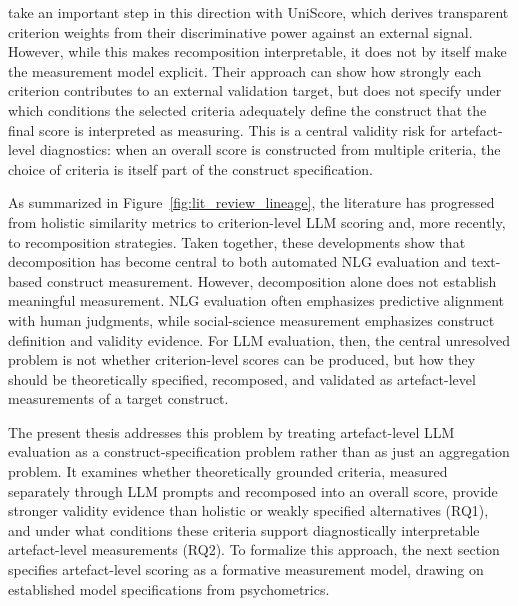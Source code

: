 \citet{bang_transforming_2025} take an important step in this direction with UniScore, which derives transparent criterion weights from their discriminative power against an external signal. However, while this makes recomposition interpretable, it does not by itself make the measurement model explicit. Their approach can show how strongly each criterion contributes to an external validation target, but does not specify under which conditions the selected criteria adequately define the construct that the final score is interpreted as measuring. This is a central validity risk for artefact-level diagnostics: when an overall score is constructed from multiple criteria, the choice of criteria is itself part of the construct specification.

As summarized in Figure~\ref{fig:lit_review_lineage}, the literature has progressed from holistic similarity metrics to criterion-level LLM scoring and, more recently, to recomposition strategies. Taken together, these developments show that decomposition has become central to both automated NLG evaluation and text-based construct measurement. However, decomposition alone does not establish meaningful measurement. NLG evaluation often emphasizes predictive alignment with human judgments, while social-science measurement emphasizes construct definition and validity evidence. For LLM evaluation, then, the central unresolved problem is not whether criterion-level scores can be produced, but how they should be theoretically specified, recomposed, and validated as artefact-level measurements of a target construct.

The present thesis addresses this problem by treating artefact-level LLM evaluation as a construct-specification problem rather than as just an aggregation problem. It examines whether theoretically grounded criteria, measured separately through LLM prompts and recomposed into an overall score, provide stronger validity evidence than holistic or weakly specified alternatives (RQ1), and under what conditions these criteria support diagnostically interpretable artefact-level measurements (RQ2). To formalize this approach, the next section specifies artefact-level scoring as a formative measurement model, drawing on established model specifications from psychometrics.


